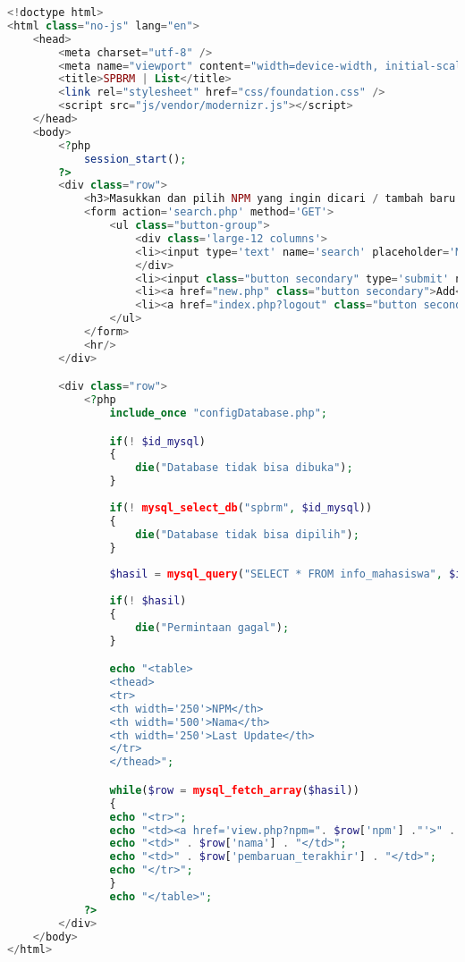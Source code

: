 \begin{lstlisting}[language=php,basicstyle=\tiny,caption=list.php]
<!doctype html>
<html class="no-js" lang="en">
	<head>
		<meta charset="utf-8" />
		<meta name="viewport" content="width=device-width, initial-scale=1.0" />
		<title>SPBRM | List</title>
		<link rel="stylesheet" href="css/foundation.css" />
		<script src="js/vendor/modernizr.js"></script>
	</head>
	<body>
		<?php
			session_start();
		?>
		<div class="row">
			<h3>Masukkan dan pilih NPM yang ingin dicari / tambah baru.</h3>
			<form action='search.php' method='GET'>
				<ul class="button-group">
					<div class='large-12 columns'>
					<li><input type='text' name='search' placeholder='Masukkan NPM yang ingin dicari'></li>
					</div>
					<li><input class="button secondary" type='submit' name='submit' value='Cari NPM'></li>
					<li><a href="new.php" class="button secondary">Add</a></li>
					<li><a href="index.php?logout" class="button secondary">Logout</a></li>
				</ul>
			</form>
			<hr/>
		</div>

		<div class="row">
			<?php
				include_once "configDatabase.php";

				if(! $id_mysql)
				{
					die("Database tidak bisa dibuka");
				}
					
				if(! mysql_select_db("spbrm", $id_mysql))
				{
					die("Database tidak bisa dipilih");
				}
			
				$hasil = mysql_query("SELECT * FROM info_mahasiswa", $id_mysql);
				
				if(! $hasil)
				{
					die("Permintaan gagal");
				}

				echo "<table>
				<thead>
				<tr>
				<th width='250'>NPM</th>
				<th width='500'>Nama</th>
				<th width='250'>Last Update</th>
				</tr>
				</thead>";

				while($row = mysql_fetch_array($hasil))
				{
				echo "<tr>";
				echo "<td><a href='view.php?npm=". $row['npm'] ."'>" . $row['npm'] . "</a></td>";
				echo "<td>" . $row['nama'] . "</td>";
				echo "<td>" . $row['pembaruan_terakhir'] . "</td>";
				echo "</tr>";
				}
				echo "</table>";
			?> 
		</div>
	</body>
</html>
\end{lstlisting}

